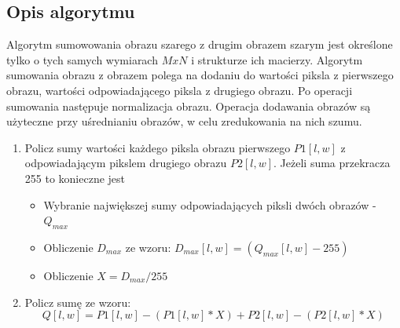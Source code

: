 \documentclass[a4paper,12pt, titlepage]{report}
\begin{document}
\subsection*{Opis algorytmu}
\par Algorytm sumowowania obrazu szarego z drugim obrazem szarym jest określone tylko o tych samych wymiarach \(MxN\) i strukturze ich macierzy. Algorytm sumowania obrazu z obrazem polega na dodaniu do wartości piksla z  pierwszego obrazu, wartości odpowiadającego piksla z drugiego obrazu. Po operacji sumowania następuje normalizacja obrazu. Operacja dodawania obrazów są użyteczne przy uśrednianiu obrazów, w celu zredukowania na nich szumu.
\begin{enumerate}
\item Policz sumy wartości każdego piksla obrazu pierwszego \(P1[l,w]\) z odpowiadającym pikslem drugiego obrazu \(P2[l,w]\). Jeżeli suma przekracza 255 to konieczne jest
\begin{itemize}
\item Wybranie największej sumy odpowiadających piksli dwóch obrazów - \(Q_{max}\) 
\item Obliczenie \(D_{max}\) ze wzoru: \(D_{max}[l,w]=(Q_{max}[l,w]-255)\)
\item Obliczenie \(X=D_{max}/255\)
\end{itemize}
\item Policz sumę ze wzoru: \[Q[l,w]=P1[l,w]-(P1[l,w]*X)+P2[l,w]-(P2[l,w]*X)\]
\end{enumerate}
\end{document}
